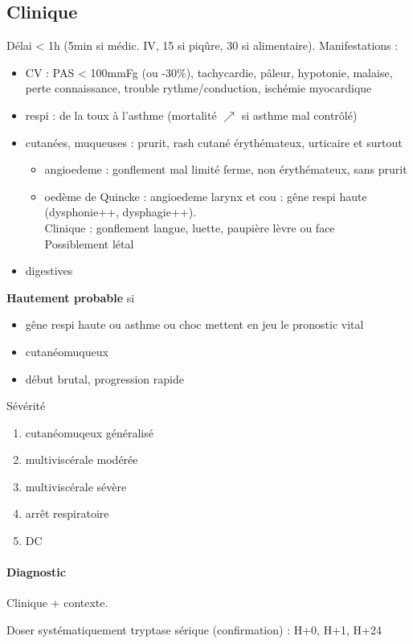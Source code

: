\subsection{Clinique}
Délai < 1h (5min si médic. IV, 15 si piqûre, 30 si alimentaire).
Manifestations :
\begin{itemize}
\item CV : PAS < 100mmFg (ou -30\%), tachycardie, pâleur, hypotonie, malaise,
  perte connaissance, trouble rythme/conduction, ischémie myocardique
\item respi : de la toux à l'asthme (mortalité $\nearrow$ si asthme mal
  contrôlé)
\item cutanées, muqueuses : prurit, rash cutané érythémateux, urticaire et
  surtout 
  \begin{itemize}
  \item angioedeme : gonflement mal limité ferme, non érythémateux, sans
    prurit
  \item oedème de Quincke : angioedeme larynx et cou : gêne respi haute
    (dysphonie++, dysphagie++). \\
    Clinique : gonflement langue, luette, paupière lèvre ou face\\
    Possiblement létal \skull
  \end{itemize}
\item digestives
\end{itemize}
\textbf{Hautement probable}  si 
\begin{itemize}
\item gêne respi haute ou asthme ou choc
  mettent en jeu le pronostic vital
\item cutanéomuqueux
\item début brutal, progression rapide
\end{itemize}
Sévérité
\begin{enumerate}[label=\Roman*]
\item cutanéomuqeux généralisé
\item multiviscérale modérée
\item multiviscérale sévère
\item arrêt respiratoire
\item DC
\end{enumerate}

\paragraph{Diagnostic}
Clinique + contexte.

Doser systématiquement tryptase sérique (confirmation) : H+0, H+1, H+24


